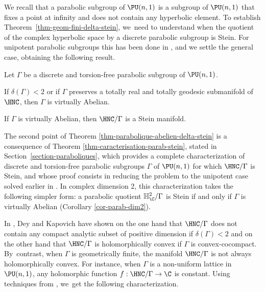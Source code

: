 We recall that a parabolic subgroup of $\PU(n,1)$ is a subgroup of $\PU(n,1)$ that fixes a point at infinity and does not contain any hyperbolic element. To establish Theorem~\ref{thm-geom-fini-delta-stein}, we~need to understand when the quotient
of the complex hyperbolic space by a discrete parabolic subgroup is Stein. For unipotent parabolic subgroups this has been done in \cite{miebachQuotientsBoundedHomogeneous2024}, and we settle the general case, obtaining the following result.
\begin{theoremIntro}\label{thm-parabolique-abelien-delta-stein}
Let $\Gamma$ be a discrete and torsion-free parabolic subgroup of $\PU(n,1)$.
\begin{enumeratea}
\item\label{thm-parabolique-abelien-delta-steina} If $\delta(\Gamma)<2$ or if $\Gamma$ preserves a totally real and totally geodesic submanifold of~$\HNC$, then $\Gamma$ is virtually Abelian.
\item\label{thm-parabolique-abelien-delta-steinb} If $\Gamma$ is virtually Abelian, then $\HNC/\Gamma$ is a Stein manifold.
\end{enumeratea}
\end{theoremIntro}

The second point of Theorem \ref{thm-parabolique-abelien-delta-stein} is a consequence of Theorem \ref{thm-caracterisation-parab-stein}, stated in Section~\ref{section-paraboliques}, which provides a complete characterization of discrete and torsion-free parabolic subgroups $\Gamma$ of $\PU(n,1)$ for which $\HNC/\Gamma$ is Stein, and whose proof consists in reducing the problem to the unipotent case solved earlier in \cite{miebachQuotientsBoundedHomogeneous2024}. In complex dimension 2, this characterization takes the following simpler form: a parabolic quotient $\mathbb{H}^{2}_{\C}/\Gamma$ is Stein if and only if $\Gamma$ is virtually Abelian (Corollary \ref{cor-parab-dim2}).

In \cite{deyNoteComplexhyperbolicKleinian2020}, Dey and Kapovich have shown on the one hand that $\HNC/\Gamma$ does not contain any compact analytic subset of positive dimension if $\delta(\Gamma)<2$ and on the other hand that $\HNC/\Gamma$ is holomorphically convex if $\Gamma$ is convex-cocompact. By~contrast, when $\Gamma$ is geometrically finite, the manifold $\HNC/\Gamma$ is not always holomorphically convex. For instance, when $\Gamma$ is a non-uniform lattice in $\PU(n,1)$, any holomorphic function $f:\HNC/\Gamma\to \C$ is constant. Using techniques from \cite{chenDiscreteGroupsHolomorphic2013}, we~get the following characterization.

